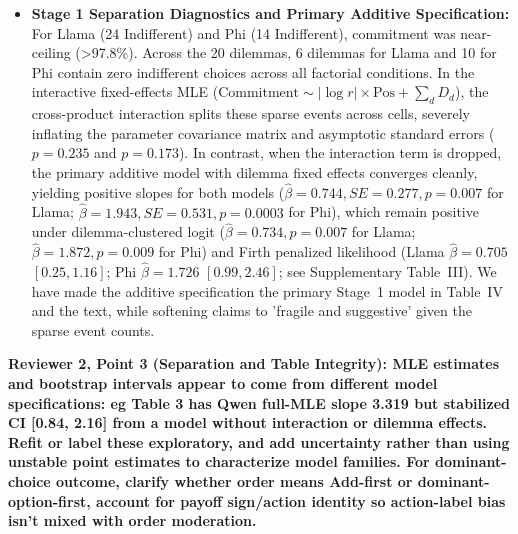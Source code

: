 \documentclass[11pt]{article}
\newcommand{\reviewercomment}[1]{\vspace{1em}\noindent\textbf{\textcolor{commentcolor}{#1}}}
\begin{document}
\begin{itemize}[leftmargin=*]
\item \textbf{Stage 1 Separation Diagnostics and Primary Additive Specification:} For Llama (24 Indifferent) and Phi (14 Indifferent), commitment was near-ceiling (>97.8\%). Across the 20 dilemmas, 6 dilemmas for Llama and 10 for Phi contain zero indifferent choices across all factorial conditions. In the interactive fixed-effects MLE ($\text{Commitment} \sim |\log r| \times \text{Pos} + \sum_d D_d$), the cross-product interaction splits these sparse events across cells, severely inflating the parameter covariance matrix and asymptotic standard errors ($p=0.235$ and $p=0.173$). In contrast, when the interaction term is dropped, the primary additive model with dilemma fixed effects converges cleanly, yielding positive slopes for both models ($\hat\beta = 0.744, SE = 0.277, p = 0.007$ for Llama; $\hat\beta = 1.943, SE = 0.531, p = 0.0003$ for Phi), which remain positive under dilemma-clustered logit ($\hat\beta = 0.734, p = 0.007$ for Llama; $\hat\beta = 1.872, p = 0.009$ for Phi) and Firth penalized likelihood (Llama $\hat\beta = 0.705$ $[0.25, 1.16]$; Phi $\hat\beta = 1.726$ $[0.99, 2.46]$; see Supplementary Table~III). We have made the additive specification the primary Stage~1 model in Table~IV and the text, while softening claims to 'fragile and suggestive' given the sparse event counts.
\end{itemize}

\reviewercomment{Reviewer 2, Point 3 (Separation and Table Integrity): MLE estimates and bootstrap intervals appear to come from different model specifications: eg Table 3 has Qwen full-MLE slope 3.319 but stabilized CI [0.84, 2.16] from a model without interaction or dilemma effects. Refit or label these exploratory, and add uncertainty rather than using unstable point estimates to characterize model families. For dominant-choice outcome, clarify whether order means Add-first or dominant-option-first, account for payoff sign/action identity so action-label bias isn't mixed with order moderation.}
\end{document}
